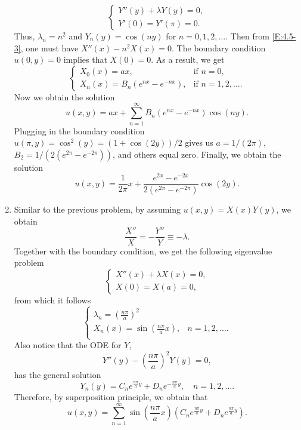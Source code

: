 \begin{enumerate}[label=(\arabic*)]
\[\begin{cases}
                Y''(y) + \lambda Y(y) = 0, \\
                Y'(0) = Y'(\pi) = 0.
            \end{cases}
        \]
        Thus, $\lambda_n=n^2$ and $Y_n(y)=\cos(ny)$ for $n=0,1,2,\ldots$. Then from \eqref{E:4.5-3}, one must have $X''(x)-n^2X(x)=0$. The boundary condition $u(0,y)=0$ implies that $X(0)=0$. As a result, we get
        \[
            \begin{cases}
                X_0(x) = ax, & \text{if $n=0$,} \\
                X_n(x) = B_n(e^{nx}-e^{-nx}), & \text{if $n=1,2,\ldots$}.
            \end{cases}
        \]
        Now we obtain the solution
        \[
            u(x,y) = ax + \sum_{n=1}^\infty B_n(e^{nx}-e^{-nx})\cos(ny).
        \]
        Plugging in the boundary condition $u(\pi,y)=\cos^2(y)=(1+\cos(2y))/2$ gives us $a=1/(2\pi)$, $B_2=1/\left(2(e^{2\pi}-e^{-2\pi})\right)$, and others equal zero. Finally, we obtain the solution
        \[
            u(x,y) = \frac{1}{2\pi}x + \frac{e^{2x}-e^{-2x}}{2(e^{2\pi}-e^{-2\pi})}\cos(2y).
        \]
    \item Similar to the previous problem, by assuming $u(x,y)=X(x)Y(y)$, we obtain
        \[
            \frac{X''}{X} = -\frac{Y''}{Y} \equiv -\lambda.
        \]
        Together with the boundary condition, we get the following eigenvalue problem
        \[
            \begin{cases}
                X''(x) + \lambda X(x) = 0, \\
                X(0) = X(a) = 0,
            \end{cases}
        \]
        from which it follows
        \[
            \begin{cases}
                \lambda_n = \left(\frac{n\pi}{a}\right)^2 & \\
                X_n(x) = \sin\left(\frac{n\pi}{a}x\right), & n=1,2,\ldots. \\
            \end{cases}
        \]
        Also notice that the ODE for $Y$,
        \[
            Y''(y) - \left(\frac{n\pi}{a}\right)^2Y(y) = 0,
        \]
        has the general solution
        \[
            Y_n(y) = C_n e^{\frac{n\pi}{a}y} + D_ne^{-\frac{n\pi}{a}y},\quad n=1,2,\ldots.
        \]
        Therefore, by superposition principle, we obtain that
        \begin{equation}\label{E:4.5-4}
            u(x,y) = \sum_{n=1}^\infty \sin\left(\frac{n\pi}{a}x\right)\left(C_ne^{\frac{n\pi}{a}y} + D_ne^{\frac{n\pi}{a}y}\right).

\end{equation}
\end{enumerate}
